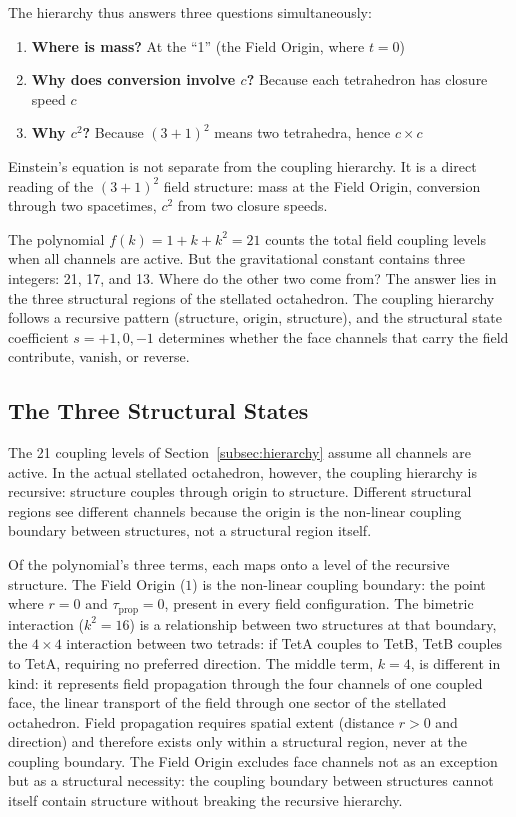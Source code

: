 \documentclass[aps,prd,preprint,superscriptaddress,showpacs,preprintnumbers,amsmath,amssymb,nofootinbib]{revtex4-2}
\begin{document}
The hierarchy thus answers three questions simultaneously:
\begin{enumerate}
\item \textbf{Where is mass?} At the ``1'' (the Field Origin, where $t = 0$)
\item \textbf{Why does conversion involve $c$?} Because each tetrahedron has closure speed $c$
\item \textbf{Why $c^2$?} Because $(3+1)^2$ means two tetrahedra, hence $c \times c$
\end{enumerate}

Einstein's equation is not separate from the coupling hierarchy. It is a direct reading of the $(3+1)^2$ field structure: mass at the Field Origin, conversion through two spacetimes, $c^2$ from two closure speeds.

The polynomial $f(k) = 1 + k + k^2 = 21$ counts the total field coupling levels when all channels are active. But the gravitational constant contains three integers: 21, 17, and 13. Where do the other two come from? The answer lies in the three structural regions of the stellated octahedron. The coupling hierarchy follows a recursive pattern (structure, origin, structure), and the structural state coefficient $s = +1, 0, -1$ determines whether the face channels that carry the field contribute, vanish, or reverse.

\subsection{The Three Structural States}
\label{subsec:states}

The 21 coupling levels of Section~\ref{subsec:hierarchy} assume all channels are active. In the actual stellated octahedron, however, the coupling hierarchy is recursive: structure couples through origin to structure. Different structural regions see different channels because the origin is the non-linear coupling boundary between structures, not a structural region itself.

Of the polynomial's three terms, each maps onto a level of the recursive structure. The Field Origin ($1$) is the non-linear coupling boundary: the point where $r = 0$ and $\tau_{\text{prop}} = 0$, present in every field configuration. The bimetric interaction ($k^2 = 16$) is a relationship between two structures at that boundary, the $4 \times 4$ interaction between two tetrads: if TetA couples to TetB, TetB couples to TetA, requiring no preferred direction. The middle term, $k = 4$, is different in kind: it represents field propagation through the four channels of one coupled face, the linear transport of the field through one sector of the stellated octahedron. Field propagation requires spatial extent (distance $r > 0$ and direction) and therefore exists only within a structural region, never at the coupling boundary. The Field Origin excludes face channels not as an exception but as a structural necessity: the coupling boundary between structures cannot itself contain structure without breaking the recursive hierarchy.
\end{document}
